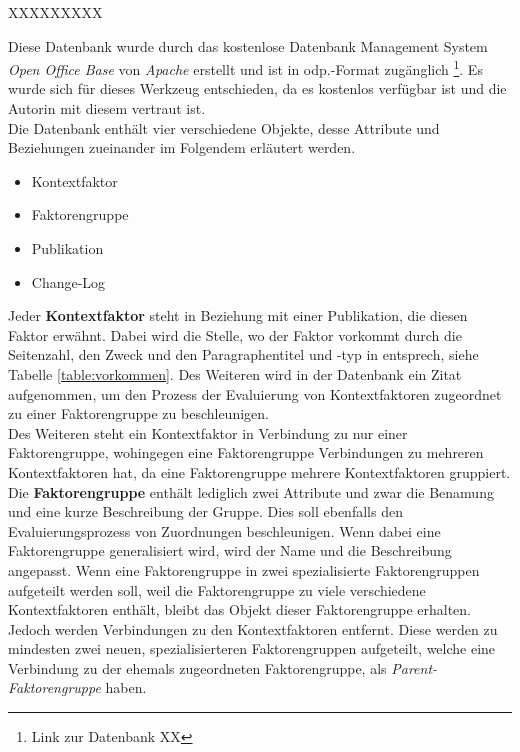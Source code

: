 XXXXXXXXX


Diese Datenbank wurde durch das kostenlose Datenbank Management System \textit{Open Office Base} von \textit{Apache} erstellt und ist in odp.-Format zugänglich \footnote{Link zur Datenbank XX}. Es wurde sich für dieses Werkzeug entschieden, da es kostenlos verfügbar ist und die Autorin mit diesem vertraut ist.\\

Die Datenbank enthält vier verschiedene Objekte, desse Attribute und Beziehungen zueinander im Folgendem erläutert werden.
\begin{itemize}
    \item Kontextfaktor
    \item Faktorengruppe
    \item Publikation
    \item Change-Log
\end{itemize}

Jeder \textbf{Kontextfaktor} steht in Beziehung mit einer Publikation, die diesen Faktor erwähnt. Dabei wird die Stelle, wo der Faktor vorkommt durch die Seitenzahl, den Zweck und den Paragraphentitel und -typ in entsprech, siehe Tabelle \ref{table:vorkommen}. 
Des Weiteren wird in der Datenbank ein Zitat aufgenommen, um den Prozess der Evaluierung von Kontextfaktoren zugeordnet zu einer Faktorengruppe zu beschleunigen. \\ 

Des Weiteren steht ein Kontextfaktor in Verbindung zu nur einer Faktorengruppe, wohingegen eine Faktorengruppe Verbindungen zu mehreren Kontextfaktoren hat, da eine Faktorengruppe mehrere Kontextfaktoren gruppiert. \\

Die \textbf{Faktorengruppe} enthält lediglich zwei Attribute und zwar die Benamung und eine kurze Beschreibung der Gruppe. Dies soll ebenfalls den Evaluierungsprozess von Zuordnungen beschleunigen. 
Wenn dabei eine Faktorengruppe generalisiert wird, wird der Name und die Beschreibung angepasst. Wenn eine Faktorengruppe in zwei spezialisierte Faktorengruppen aufgeteilt werden soll, weil die Faktorengruppe zu viele verschiedene Kontextfaktoren enthält, bleibt das Objekt dieser Faktorengruppe erhalten. Jedoch werden Verbindungen zu den Kontextfaktoren entfernt. Diese werden zu mindesten zwei neuen, spezialisierteren Faktorengruppen aufgeteilt, welche eine Verbindung zu der ehemals zugeordneten Faktorengruppe, als \textit{Parent-Faktorengruppe} haben. \\

